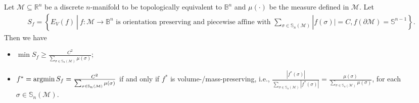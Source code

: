 \documentclass{article}
\begin{document}
\begin{theorem} \label{thm:Sf_discrete}
Let $\mathcal{M}\subseteq \mathbb{R}^n$ be a discrete $n$-manifold to be topologically equivalent to $\mathbb{B}^n$ and $\mu(\cdot)$ be the measure defined in $\mathcal{M}$. Let
\begin{align}
    S_f = \left\{E_V(f)~|~f:\mathcal{M}\to \mathbb{B}^n \text{ is orientation preserving and piecewise affine with } \sum_{\sigma\in \mathbb{S}_n(\mathcal{M})} |f(\sigma)| = C, f(\partial \mathcal{M}) = \mathbb{S}^{n-1} \right\}. \label{set:Sf}
\end{align}
Then we have
\begin{itemize}
    \item[(i)] $\min S_f \geq \frac{C^2}{\sum_{\sigma \in \mathbb{S}_n(\mathcal{M})}\mu(\sigma)}$;
    \item[(ii)] $f^* = \argmin S_f = \frac{C^2}{\sum_{\sigma \in \mathbb{S}_n(\mathcal{M})} \mu(\sigma)}$ if and only if $f^*$ is volume-/mass-preserving, i.e., $\frac{|f^*(\sigma)|}{\sum_{\sigma\in \mathbb{S}_n(\mathcal{M})} |f^*(\sigma)|} = \frac{\mu(\sigma)}{\sum_{\sigma\in \mathbb{S}_n(\mathcal{M})} \mu(\sigma)}$, for each $\sigma \in \mathbb{S}_n(\mathcal{M})$.
\end{itemize}
\end{theorem}
\end{document}
